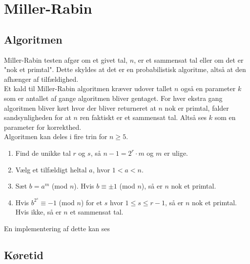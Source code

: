 \documentclass[12pt]{article}
\author{Nikolaj Dybdahl Rathcke}
\begin{document}
\section*{Miller-Rabin}
\subsection*{Algoritmen}
Miller-Rabin testen afgør om et givet tal, $n$, er et sammensat tal eller om det er "nok et primtal". Dette skyldes at det er en probabilistisk algoritme, altså at den afhænger af tilfældighed. \\
Et kald til Miller-Rabin algoritmen kræver udover tallet $n$ også en parameter $k$ som er antallet af gange algoritmen bliver gentaget. For hver ekstra gang algoritmen bliver kørt hvor der bliver returneret at $n$ nok er primtal, falder sandsynligheden for at $n$ ren faktiskt er et sammensat tal. Altså ses $k$ som en parameter for korrekthed. \\
Algoritmen kan deles i fire trin for $n\geq 5$.
\begin{enumerate}
\item Find de unikke tal $r$ og $s$, så $n-1=2^r\cdot m$ og $m$ er ulige.
\item Vælg et tilfældigt heltal $a$, hvor $1<a<n$.
\item Sæt $b=a^m$ (mod $n$). Hvis $b\equiv \pm 1$ (mod $n$), så er $n$ nok et primtal.
\item Hvis $b^{2^s}\equiv -1$ (mod $n$) for et $s$ hvor $1\leq s\leq r-1$, så er $n$ nok et primtal. Hvis ikke, så er $n$ et sammensat tal.
\end{enumerate}
En implementering af dette kan ses

\subsection*{Køretid}
\end{document}
